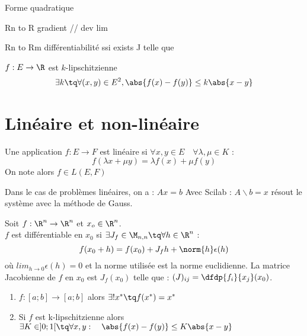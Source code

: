 Forme quadratique

Rn to R
gradient // dev lim

Rn to Rm
différentiabilité ssi exists J telle que

\begin{theoreme}
$f : E \to \R$ est $k$-lipschitzienne
$$
	\exists k \tq \forall (x,y)\in E^{2}, \abs{f(x)-f(y)} \leq k\abs{x-y}
$$
\end{theoreme}



	
\section{Linéaire et non-linéaire}

		\begin{definition}[Linéarité]
			Une application $f:E \to F$ est linéaire si $\forall x,y\in E\quad \forall \lambda ,\mu \in K$ :
			\begin{equation}
				f(\lambda x + \mu y) = \lambda f(x) + \mu f(y)
			\end{equation}
			On note alors $f\in L(E,F)$ 
		\end{definition}

		Dans le cas de problèmes linéaires, on a : $Ax=b$
		Avec Scilab : $A\backslash b = x$ résout le système avec la méthode de Gauss.

		




		\begin{definition}[Différentiabilité]
			Soit $f: \R^n \to \R^n$ et $x_o \in \R^n$.
			\\$f$ est différentiable en $x_0$ si $\exists J_f \in \M_{n,n} \tq \forall h \in \R^n$ :
			$$
				f(x_0 +h) = f(x_0) + J_f h + \norm{h} \epsilon(h)
			$$
			où $lim_{h \to 0} \epsilon(h) = 0$ et la norme utilisée est la norme euclidienne.
			La matrice Jacobienne de $f$ en $x_0$ est $J_f(x_0)$ telle que : $(J)_{ij} = \dfdp{f_i}{x_j}(x_0)$.
		\end{definition}


		\bigskip
		\begin{theoreme}
			\begin{enumerate}
				\item $f : [a;b] \to [a;b]$ alors \quad $\exists! x^* \tq f(x^*)=x^*$
				\item Si $f$ est k-lipschitzienne alors \quad $\exists K \in ]0;1[ \tq \forall x,y :\quad \abs{f(x)-f(y)} \leq K\abs{x-y}$
			\end{enumerate}
		\end{theoreme}
